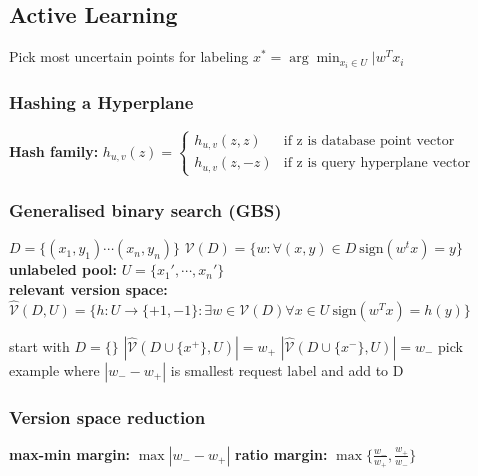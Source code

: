 \documentclass[10pt,parskip]{scrartcl}
\begin{document}
\begin{multicols*}{3}
\subsection{Active Learning} %
\label{sub:active_learning}
Pick most uncertain points for labeling 
$x^{\ast} = \arg\min_{x_i\in U}|w^Tx_i$ \\
\subsubsection{Hashing a Hyperplane} %
\label{ssub:hashing_a_hyperplane}
\textbf{Hash family: } $h_{u,v}(z) = \begin{cases}
	h_{u,v}(z,z) & \text{if z is database point vector} \\
	h_{u,v}(z,-z) & \text{if z is query hyperplane vector}
\end{cases}$ \\
\subsubsection{Generalised binary search (GBS)} %
\label{ssub:gbs}
$D = \{(x_1,y_1) \cdots (x_n,y_n) \}$ \qquad 
$\mathcal{V}(D) = \{w: \forall(x,y) \in D \ \mathrm{sign}(w^tx) = y \}$ \\
\textbf{unlabeled pool: } $U = \{x_1',\cdots,x_n'\}$ \\
\textbf{relevant version space: } $\hat{\mathcal{V}}(D,U) = \{h:U \to \{+1,-1\} : \exists w \in \mathcal{V}(D) \forall x\in U \ \mathrm{sign}(w^Tx) = h(y) \}$
\begin{mdframed}
	\begin{algorithmic}
		\State start with $D=\{\}$
				\State $|\hat{\mathcal{V}}(D\cup \{x^+\},U)| = w_+$
				\State $|\hat{\mathcal{V}}(D\cup \{x^-\},U)| = w_-$
			\EndFor
			\State pick example where $|w_- - w_+|$ is smallest
			\State request label and add to D
		\EndWhile
	\end{algorithmic}
\end{mdframed}
\subsubsection{Version space reduction} %
\label{ssub:version_space_reduction}
\textbf{max-min margin: } $\max |w_- - w_+|$ \quad \textbf{ratio margin: } $\max \{\frac{w_-}{w_+},\frac{w_+}{w_-} \}$

\end{multicols*}
\end{document}
